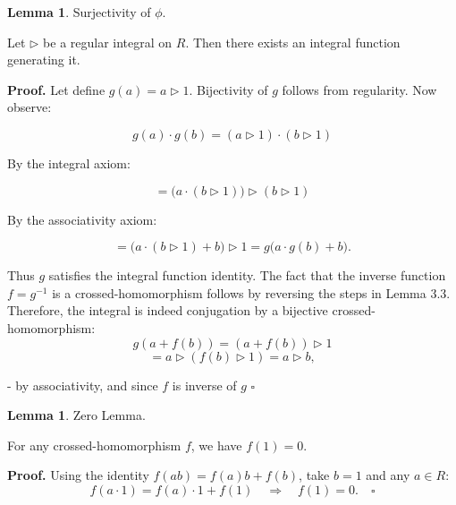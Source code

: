 \documentclass[12pt]{article}
\theoremstyle{definition}
\newtheorem{lemma}[definition]{Lemma}
\begin{document}
\vspace{10pt}
\begin{lemma} Surjectivity of $\phi$.

\vspace{5pt}
\noindent Let $\triangleright$ be a regular integral on $R$. Then there exists an integral function generating it.

\vspace{5pt}
\noindent\textbf{Proof.} Let define $g(a) = a \triangleright 1$. Bijectivity of $g$ follows from regularity. Now observe:  

\[
g(a) \cdot g(b) = (a \triangleright 1) \cdot (b \triangleright 1)
\]  

\noindent By the integral axiom:  

\[
= \big(a \cdot (b \triangleright 1)\big) \triangleright (b \triangleright 1)
\]  

\noindent By the associativity axiom:  

\[
= \big(a \cdot (b \triangleright 1) + b\big) \triangleright 1 = g\big(a \cdot g(b) + b\big).
\]  

Thus $g$ satisfies the integral function identity. 
The fact that the inverse function $f = g^{-1}$ is a crossed-homomorphism 
follows by reversing the steps in Lemma 3.3.
Therefore, the integral is indeed conjugation by a bijective crossed-homomorphism:
\[
g(a + f(b)) = (a + f(b)) \triangleright 1
\] 
\[
= a \triangleright (f(b) \triangleright 1) = a \triangleright b,
\]

- by associativity, and since $f$ is inverse of $g$ $\square$



\end{lemma}

\vspace{10pt}
\begin{lemma} Zero Lemma.  

\vspace{10pt}
\noindent For any crossed-homomorphism $f$, we have $f(1) = 0$.

\vspace{5pt}
\noindent\textbf{Proof.} Using the identity $f(ab) = f(a)b + f(b)$, take $b = 1$ and any $a \in R$:
\[
f(a \cdot 1) = f(a) \cdot 1 + f(1) \quad \Rightarrow \quad f(1) = 0. \quad \square
\]
\end{lemma}
\end{document}
